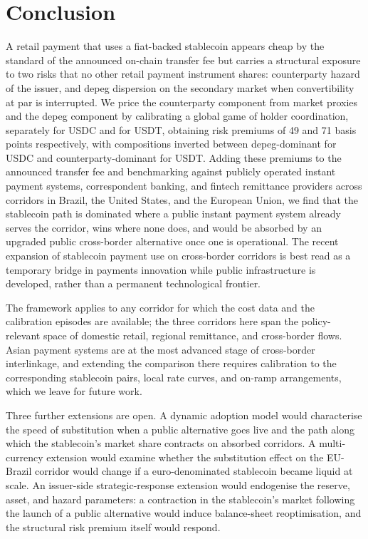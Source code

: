 \section{Conclusion}\label{sec:conclusion}

A retail payment that uses a fiat-backed stablecoin appears cheap by the standard of the announced on-chain transfer fee but carries a structural exposure to two risks that no other retail payment instrument shares: counterparty hazard of the issuer, and depeg dispersion on the secondary market when convertibility at par is interrupted. We price the counterparty component from market proxies and the depeg component by calibrating a global game of holder coordination, separately for USDC and for USDT, obtaining risk premiums of 49 and 71 basis points respectively, with compositions inverted between depeg-dominant for USDC and counterparty-dominant for USDT. Adding these premiums to the announced transfer fee and benchmarking against publicly operated instant payment systems, correspondent banking, and fintech remittance providers across corridors in Brazil, the United States, and the European Union, we find that the stablecoin path is dominated where a public instant payment system already serves the corridor, wins where none does, and would be absorbed by an upgraded public cross-border alternative once one is operational. The recent expansion of stablecoin payment use on cross-border corridors is best read as a temporary bridge in payments innovation while public infrastructure is developed, rather than a permanent technological frontier.

The framework applies to any corridor for which the cost data and the calibration episodes are available; the three corridors here span the policy-relevant space of domestic retail, regional remittance, and cross-border flows. Asian payment systems are at the most advanced stage of cross-border interlinkage, and extending the comparison there requires calibration to the corresponding stablecoin pairs, local rate curves, and on-ramp arrangements, which we leave for future work.

Three further extensions are open. A dynamic adoption model would characterise the speed of substitution when a public alternative goes live and the path along which the stablecoin's market share contracts on absorbed corridors. A multi-currency extension would examine whether the substitution effect on the EU-Brazil corridor would change if a euro-denominated stablecoin became liquid at scale. An issuer-side strategic-response extension would endogenise the reserve, asset, and hazard parameters: a contraction in the stablecoin's market following the launch of a public alternative would induce balance-sheet reoptimisation, and the structural risk premium itself would respond.
